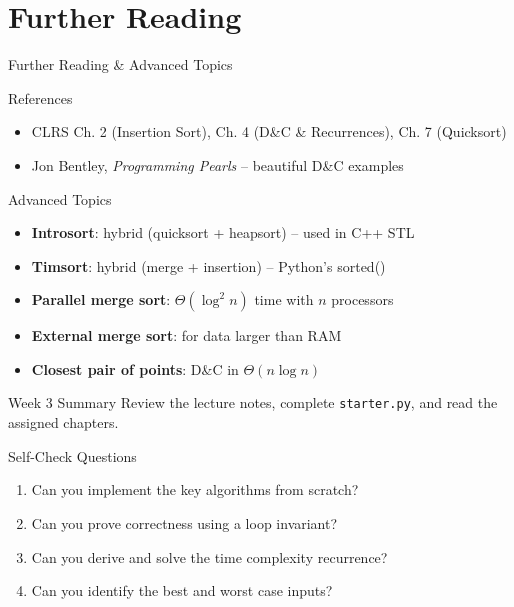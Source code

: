 \documentclass[aspectratio=169,xcolor=dvipsnames]{beamer}
\begin{document}
\section{Further Reading}
\begin{frame}{Further Reading \& Advanced Topics}
  \begin{block}{References}
    \begin{itemize}
      \item CLRS Ch. 2 (Insertion Sort), Ch. 4 (D\&C \& Recurrences), Ch. 7 (Quicksort)
      \item Jon Bentley, \textit{Programming Pearls} -- beautiful D\&C examples
    \end{itemize}
  \end{block}
  \begin{exampleblock}{Advanced Topics}
    \begin{itemize}
      \item \textbf{Introsort}: hybrid (quicksort + heapsort) -- used in C++ STL
      \item \textbf{Timsort}: hybrid (merge + insertion) -- Python's sorted()
      \item \textbf{Parallel merge sort}: $\Theta(\log^2 n)$ time with $n$ processors
      \item \textbf{External merge sort}: for data larger than RAM
      \item \textbf{Closest pair of points}: D\&C in $\Theta(n\log n)$
    \end{itemize}
  \end{exampleblock}
\end{frame}

\begin{frame}{Week 3 Summary}
  Review the lecture notes, complete \texttt{starter.py}, and read the assigned chapters.\\[6pt]
  \begin{block}{Self-Check Questions}
    \begin{enumerate}
      \item Can you implement the key algorithms from scratch?
      \item Can you prove correctness using a loop invariant?
      \item Can you derive and solve the time complexity recurrence?
      \item Can you identify the best and worst case inputs?
    \end{enumerate}
  \end{block}
\end{frame}
\end{document}
